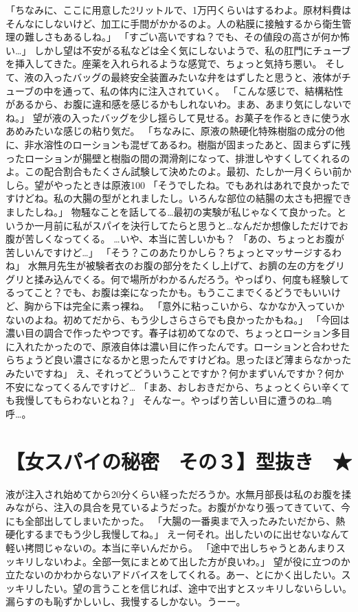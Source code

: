 「ちなみに、ここに用意した2リットルで、1万円くらいはするわよ。原材料費はそんなにしないけど、加工に手間がかかるのよ。人の粘膜に接触するから衛生管理の難しさもあるしね。」
「すごい高いですね？でも、その値段の高さが何か怖い…」
しかし望は不安がる私などは全く気にしないようで、私の肛門にチューブを挿入してきた。座薬を入れられるような感覚で、ちょっと気持ち悪い。
そして、液の入ったバッグの最終安全装置みたいな弁をはずしたと思うと、液体がチューブの中を通って、私の体内に注入されていく。
「こんな感じで、結構粘性があるから、お腹に違和感を感じるかもしれないわ。まあ、あまり気にしないでね。」
望が液の入ったバッグを少し揺らして見せる。お菓子を作るときに使う水あめみたいな感じの粘り気だ。
「ちなみに、原液の熱硬化特殊樹脂の成分の他に、非水溶性のローションも混ぜてあるわ。樹脂が固まったあと、固まらずに残ったローションが腸壁と樹脂の間の潤滑剤になって、排泄しやすくしてくれるのよ。この配合割合もたくさん試験して決めたのよ。最初、たしか一月くらい前かしら。望がやったときは原液100%
「そうでしたね。でもあれはあれで良かったですけどね。私の大腸の型がとれましたし。いろんな部位の結腸の太さも把握できましたしね。」
物騒なことを話してる…最初の実験が私じゃなくて良かった。というか一月前に私がスパイを決行してたらと思うと…なんだか想像しただけでお腹が苦しくなってくる。
…いや、本当に苦しいかも？
「あの、ちょっとお腹が苦しいんですけど…」
「そう？このあたりかしら？ちょっとマッサージするわね」
水無月先生が被験者衣のお腹の部分をたくし上げて、お臍の左の方をグリグリと揉み込んでくる。何で場所がわかるんだろう。やっぱり、何度も経験してるってこと？でも、お腹は楽になったかも。もうここまでくるどうでもいいけど、胸から下は完全に素っ裸ね。
「意外に粘っこいから、なかなか入っていかないのよね。初めてだから、もう少しさらさらでも良かったかもね。」
「今回は濃い目の調合で作ったやつです。春子は初めてなので、ちょっとローション多目に入れたかったので、原液自体は濃い目に作ったんです。ローションと合わせたらちょうど良い濃さになるかと思ったんですけどね。思ったほど薄まらなかったみたいですね」
え、それってどういうことですか？何かまずいんですか？何か不安になってくるんですけど…
「まあ、おしおきだから、ちょっとくらい辛くても我慢してもらわないとね？」
そんなー。やっぱり苦しい目に遭うのね…嗚呼…。


\section{【女スパイの秘密　その３】型抜き　★}

液が注入され始めてから20分くらい経っただろうか。水無月部長は私のお腹を揉みながら、注入の具合を見ているようだった。お腹がかなり張ってきていて、今にも全部出してしまいたかった。
「大腸の一番奥まで入ったみたいだから、熱硬化するまでもう少し我慢してね。」
えー何それ。出したいのに出せないなんて軽い拷問じゃないの。本当に辛いんだから。
「途中で出しちゃうとあんまりスッキリしないわよ。全部一気にまとめて出した方が良いわ。」
望が役に立つのか立たないのかわからないアドバイスをしてくれる。あー、とにかく出したい。スッキリしたい。望の言うことを信じれば、途中で出すとスッキリしないらしい。漏らすのも恥ずかしいし、我慢するしかない。うーー。

